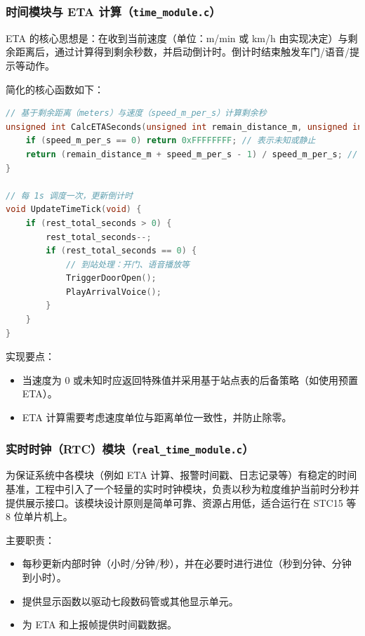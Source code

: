 \documentclass[12pt]{article}
\begin{document}
\subsubsection{时间模块与 ETA 计算（\texttt{time\_module.c}）}
ETA 的核心思想是：在收到当前速度（单位：m/min 或 km/h 由实现决定）与剩余距离后，通过计算得到剩余秒数，并启动倒计时。倒计时结束触发车门/语音/提示等动作。

简化的核心函数如下：
\begin{lstlisting}[language=C]
// 基于剩余距离（meters）与速度（speed_m_per_s）计算剩余秒
unsigned int CalcETASeconds(unsigned int remain_distance_m, unsigned int speed_m_per_s) {
	if (speed_m_per_s == 0) return 0xFFFFFFFF; // 表示未知或静止
	return (remain_distance_m + speed_m_per_s - 1) / speed_m_per_s; // 向上取整
}

// 每 1s 调度一次，更新倒计时
void UpdateTimeTick(void) {
	if (rest_total_seconds > 0) {
		rest_total_seconds--;
		if (rest_total_seconds == 0) {
			// 到站处理：开门、语音播放等
			TriggerDoorOpen();
			PlayArrivalVoice();
		}
	}
}
\end{lstlisting}

实现要点：
\begin{itemize}
\item 当速度为 0 或未知时应返回特殊值并采用基于站点表的后备策略（如使用预置 ETA）。
\item ETA 计算需要考虑速度单位与距离单位一致性，并防止除零。
\end{itemize}

\subsubsection{实时时钟（RTC）模块（\texttt{real\_time\_module.c}）}
为保证系统中各模块（例如 ETA 计算、报警时间戳、日志记录等）有稳定的时间基准，工程中引入了一个轻量的实时时钟模块，负责以秒为粒度维护当前时分秒并提供展示接口。该模块设计原则是简单可靠、资源占用低，适合运行在 STC15 等 8 位单片机上。

主要职责：
\begin{itemize}
\item 每秒更新内部时钟（小时/分钟/秒），并在必要时进行进位（秒到分钟、分钟到小时）。
\item 提供显示函数以驱动七段数码管或其他显示单元。
\item 为 ETA 和上报帧提供时间戳数据。
\end{itemize}
\end{document}
